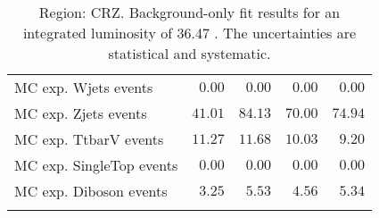 \begin{table}
\begin{center}
{\begin{tabular*}{\textwidth}{@{\extracolsep{\fill}}lrrrr}
        MC exp. Wjets events         & $0.00$          & $0.00$          & $0.00$          & $0.00$              \\
        MC exp. Zjets events         & $41.01$          & $84.13$          & $70.00$          & $74.94$              \\
        MC exp. TtbarV events         & $11.27$          & $11.68$          & $10.03$          & $9.20$              \\
        MC exp. SingleTop events         & $0.00$          & $0.00$          & $0.00$          & $0.00$              \\
        MC exp. Diboson events         & $3.25$          & $5.53$          & $4.56$          & $5.34$              \\
\noalign{\smallskip}\hline\noalign{\smallskip}
\end{tabular*}
}
\end{center}
\caption{Region: CRZ. Background-only fit results for an integrated luminosity of 36.47 \ifb. The uncertainties are statistical and systematic.
}
\label{table.bkgonly.CRZ}
\end{table}
%